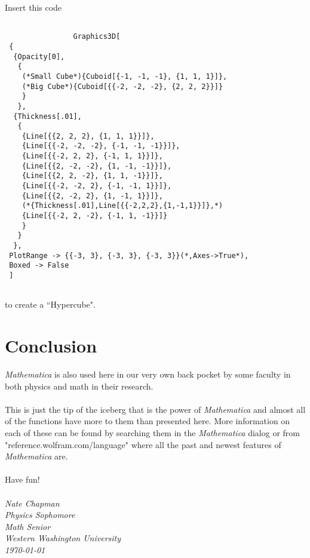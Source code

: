 \documentclass[11pt,a4paper,twoside]{article}
\begin{document}
		Insert this code
		
			\begin{verbatim}
			
				Graphics3D[
 {
  {Opacity[0],
   {
    (*Small Cube*){Cuboid[{-1, -1, -1}, {1, 1, 1}]},
    (*Big Cube*){Cuboid[{{-2, -2, -2}, {2, 2, 2}}]}
    }
   },
  {Thickness[.01],
   {
    {Line[{{2, 2, 2}, {1, 1, 1}}]},
    {Line[{{-2, -2, -2}, {-1, -1, -1}}]},
    {Line[{{-2, 2, 2}, {-1, 1, 1}}]},
    {Line[{{2, -2, -2}, {1, -1, -1}}]},
    {Line[{{2, 2, -2}, {1, 1, -1}}]},
    {Line[{{-2, -2, 2}, {-1, -1, 1}}]},
    {Line[{{2, -2, 2}, {1, -1, 1}}]},
    (*{Thickness[.01],Line[{{-2,2,2},{1,-1,1}}]},*)
    {Line[{{-2, 2, -2}, {-1, 1, -1}}]}
    }
   }
  },
 PlotRange -> {{-3, 3}, {-3, 3}, {-3, 3}}(*,Axes->True*), 
 Boxed -> False
 ]
			
			\end{verbatim}
			
			to create a ``Hypercube".
		
%		
%		
%		
%		
		
\newpage
				
	\part{Conclusion}
	
		\textit{Mathematica} is also used here in our very own back pocket by some faculty in both physics and math in their research.
		\\
		\\
		This is just the tip of the iceberg that is the power of \textit{Mathematica} and almost all of the functions have more to them than presented here.  More information on each of these can be found by searching them in the \textit{Mathematica} dialog or from "reference.wolfram.com/language" where all the past and newest features of \textit{Mathematica} are.
		\\
		\\
		Have fun!
		\\
		\\
		\textit{Nate Chapman \\Physics Sophomore \\Math Senior \\ Western Washington University \\ \today} 
		
\end{document}
